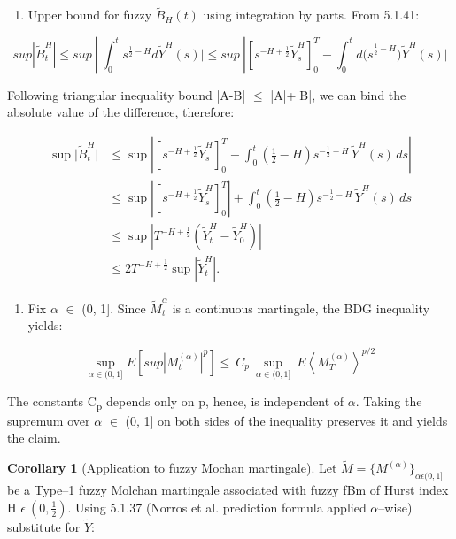 \documentclass[12pt,a4paper]{report}
\numberwithin{equation}{section}
\begin{document}
\begin{enumerate}
\def\labelenumi{\arabic{enumi}.}
\setcounter{enumi}{2}
\item
  Upper bound for fuzzy \({\widetilde{B}}_{H}(t)\) using integration by
  parts. From 5.1.41:
\end{enumerate}

\[sup|{\widetilde{B}}_{t}^{H}| \leq sup\ |\ \int_{0}^{t}{s^{\frac{1}{2} - H}d{\widetilde{Y}}^{H}(s)| \leq}sup\ |\left\lbrack s^{- H + \frac{1}{2}}{\widetilde{Y}}_{s}^{H} \right\rbrack_{0}^{T} - \int_{0}^{t}{{d(s}^{\frac{1}{2} - H}){\widetilde{Y}}^{H}(s)|}\]

Following triangular
inequality bound |A-B| $\leq$ |A|+|B|, we can bind the absolute value of the
difference, therefore:

\[
\begin{aligned}
\sup\bigl|\widetilde{B}_{t}^{H}\bigr|
&\le \sup\left|\left[s^{-H+\frac{1}{2}}\widetilde{Y}_{s}^{H}\right]_{0}^{T}
-\int_{0}^{t}\left(\tfrac{1}{2}-H\right)s^{-\frac{1}{2}-H}\,\widetilde{Y}^{H}(s)\,ds\right| \\
&\le \sup\left|\left[s^{-H+\frac{1}{2}}\widetilde{Y}_{s}^{H}\right]_{0}^{T}\right|
+ \int_{0}^{t}\left(\tfrac{1}{2}-H\right)s^{-\frac{1}{2}-H}\,\widetilde{Y}^{H}(s)\,ds \\
&\le \sup\left|T^{-H+\frac{1}{2}}\left(\widetilde{Y}_{t}^{H}-\widetilde{Y}_{0}^{H}\right)\right| \\
&\le 2T^{-H+\frac{1}{2}}\sup\left|\widetilde{Y}_{t}^{H}\right|.
\end{aligned}
\]


\begin{enumerate}
\def\labelenumi{\arabic{enumi}.}
\setcounter{enumi}{3}
\item
  Fix $\alpha$ $\in$ (0, 1{]}. Since \({\widetilde{M}}_{t}^{\alpha}\) is a
  continuous martingale, the BDG inequality yields:
\end{enumerate}

\[\sup_{\alpha \in (0,1\rbrack}{E\left\lbrack {sup|M_{t}^{(\alpha)}|}^{p} \right\rbrack} \leq \ C_{p}\ \sup_{\alpha \in (0,1\rbrack}{\ E\left\langle M_{T}^{(\alpha)} \right\rangle}^{p/2}\]

The constants C\textsubscript{p} depends only on p, hence, is
independent of \emph{$\alpha$}. Taking the supremum over \emph{$\alpha$} $\in$ (0, 1{]} on
both sides of the inequality preserves it and yields the claim.

\textbf{Corollary 1} (Application to fuzzy Mochan martingale). Let
\(\widetilde{M} = {\{ M^{(\alpha)}\}}_{\alpha\epsilon(0,1\rbrack}\)be a
Type--1 fuzzy Molchan martingale associated with fuzzy fBm of Hurst index
H \(\epsilon\ (0,\frac{1}{2})\). Using 5.1.37 (Norros et al. prediction
formula applied $\alpha$--wise) substitute for \(\widetilde{Y}\):
\end{document}
